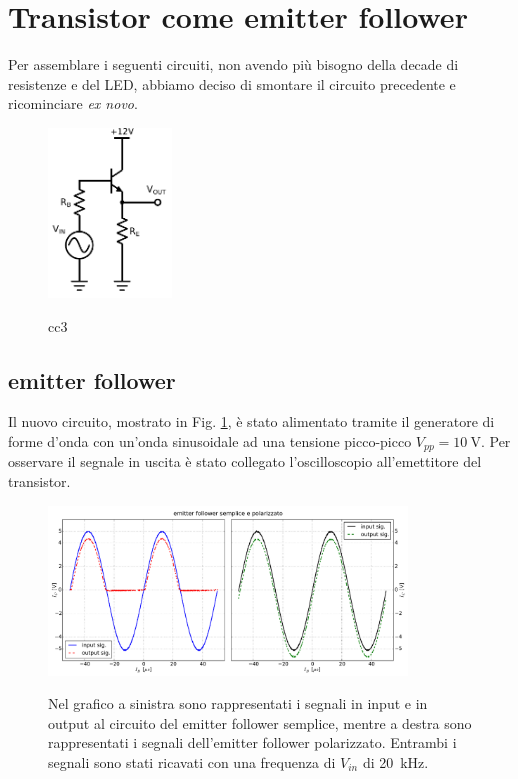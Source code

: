 \section{Transistor come emitter follower}

Per assemblare i seguenti circuiti, non avendo più bisogno della decade di resistenze e del LED, abbiamo deciso di smontare il circuito precedente e ricominciare \emph{ex novo}.

\begin{figure}
	\caption{cc3}
	\includegraphics[height=45mm]{cc3.pdf}
	\label{fig:cc3}
\end{figure}

\subsection{emitter follower}
Il nuovo circuito, mostrato in Fig. \ref{fig:cc3}, è stato alimentato tramite il generatore di forme d'onda con un'onda sinusoidale ad una tensione picco-picco $V_{pp} = \SI{10}{\volt}$. Per osservare il segnale in uscita è stato collegato l'oscilloscopio all'emettitore del transistor.

\begin{figure}[h]
\center
	\caption{Nel grafico a sinistra sono rappresentati i segnali in input e in output al circuito del emitter follower semplice, mentre a destra sono rappresentati i segnali dell'emitter follower polarizzato. Entrambi i segnali sono stati ricavati con una frequenza di $V_{in}$ di \SI{20}{\kilo\hertz}.}
	\includegraphics[width=0.85\textwidth]{cc3+cc4.pdf}
	\label{fig:cc3+cc4}
\end{figure}

